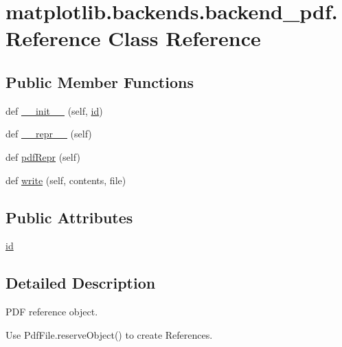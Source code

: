 \hypertarget{classmatplotlib_1_1backends_1_1backend__pdf_1_1Reference}{}\section{matplotlib.\+backends.\+backend\+\_\+pdf.\+Reference Class Reference}
\label{classmatplotlib_1_1backends_1_1backend__pdf_1_1Reference}
\subsection*{Public Member Functions}
\begin{DoxyCompactItemize}
\item 
def \hyperlink{classmatplotlib_1_1backends_1_1backend__pdf_1_1Reference_a03921e18d02b72b965050c07717631b3}{\+\_\+\+\_\+init\+\_\+\+\_\+} (self, \hyperlink{classmatplotlib_1_1backends_1_1backend__pdf_1_1Reference_a288c245ab989ab165abd68262c6e7edc}{id})
\item 
def \hyperlink{classmatplotlib_1_1backends_1_1backend__pdf_1_1Reference_aae2c28c18ceda1dc7b7a557c547e19d4}{\+\_\+\+\_\+repr\+\_\+\+\_\+} (self)
\item 
def \hyperlink{classmatplotlib_1_1backends_1_1backend__pdf_1_1Reference_ab81029b3196eb44613289c29e88ea152}{pdf\+Repr} (self)
\item 
def \hyperlink{classmatplotlib_1_1backends_1_1backend__pdf_1_1Reference_a2ac66102eb5f2188150e6e81ccf9c9f0}{write} (self, contents, file)
\end{DoxyCompactItemize}
\subsection*{Public Attributes}
\begin{DoxyCompactItemize}
\item 
\hyperlink{classmatplotlib_1_1backends_1_1backend__pdf_1_1Reference_a288c245ab989ab165abd68262c6e7edc}{id}
\end{DoxyCompactItemize}


\subsection{Detailed Description}
\begin{DoxyVerb}PDF reference object.

Use PdfFile.reserveObject() to create References.
\end{DoxyVerb}
 

